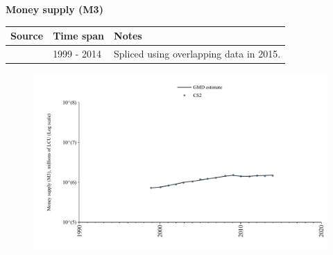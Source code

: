 \documentclass[12pt,a4paper,landscape]{article}
\begin{document}
\begin{adjustbox}{max totalsize={\paperwidth}{\paperheight},center}
\begin{minipage}[t][\textheight][t]{\textwidth}
\vspace*{0.5cm}
{}
\begin{center}
{\Large\bfseries Money supply (M3)}
\end{center}
\vspace{0.5cm}
\begin{table}[H]
\centering
\small
\begin{tabular}{|l|l|l|}
\hline
\textbf{Source} & \textbf{Time span} & \textbf{Notes} \\
\hline
\rowcolor{white}\cite{CS2_ITA}& 1999 - 2014 &Spliced using overlapping data in 2015. \\
\hline
\end{tabular}
\end{table}
\begin{figure}[H]
\centering
\includegraphics[width=\textwidth,height=0.6\textheight,keepaspectratio]{graphs/ITA_M3.pdf}
\end{figure}
\end{minipage}
\end{adjustbox}
\end{document}
